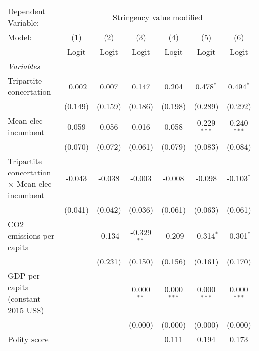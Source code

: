 
\begingroup
\centering
\begin{tabular}{lcccccc}
   \toprule
   Dependent Variable: & \multicolumn{6}{c}{Stringency value modified}\\
   Model:                                                & (1)     & (2)     & (3)           & (4)           & (5)           & (6)\\  
                                                         &  Logit  & Logit   & Logit         & Logit         & Logit         & Logit\\  
   \midrule
   \emph{Variables}\\
   Tripartite concertation                               & -0.002  & 0.007   & 0.147         & 0.204         & 0.478$^{*}$   & 0.494$^{*}$\\   
                                                         & (0.149) & (0.159) & (0.186)       & (0.198)       & (0.289)       & (0.292)\\   
   Mean elec incumbent                                   & 0.059   & 0.056   & 0.016         & 0.058         & 0.229$^{***}$ & 0.240$^{***}$\\   
                                                         & (0.070) & (0.072) & (0.061)       & (0.079)       & (0.083)       & (0.084)\\   
   Tripartite concertation $\times$ Mean elec incumbent  & -0.043  & -0.038  & -0.003        & -0.008        & -0.098        & -0.103$^{*}$\\   
                                                         & (0.041) & (0.042) & (0.036)       & (0.061)       & (0.063)       & (0.061)\\   
   CO2 emissions per capita                              &         & -0.134  & -0.329$^{**}$ & -0.209        & -0.314$^{*}$  & -0.301$^{*}$\\   
                                                         &         & (0.231) & (0.150)       & (0.156)       & (0.161)       & (0.170)\\   
   GDP per capita (constant 2015 US\$)                   &         &         & 0.000$^{**}$  & 0.000$^{***}$ & 0.000$^{***}$ & 0.000$^{***}$\\   
                                                         &         &         & (0.000)       & (0.000)       & (0.000)       & (0.000)\\   
   Polity score                                          &         &         &               & 0.111         & 0.194         & 0.173\\   

\end{tabular}
